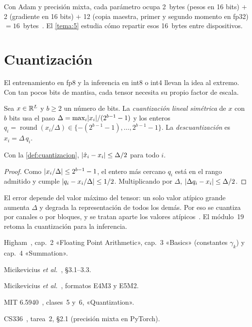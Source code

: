 \begin{observacion}
Con Adam y precisión mixta, cada parámetro ocupa 2~bytes (pesos en 16 bits) $+$ 2 (gradiente en 16 bits) $+$ 12 (copia maestra, primer y segundo momento en fp32) $=16$~bytes~\cite[§3.1]{zero}. El \cref{tema:5} estudia cómo repartir esos 16~bytes entre dispositivos.
\end{observacion}

\section{Cuantización}

El entrenamiento en fp8 y la inferencia en int8 o int4 llevan la idea al extremo. Con tan pocos bits de mantisa, cada tensor necesita su propio factor de escala.

\begin{definicion}\label{def:cuantizacion}
Sea $x\in\mathbb{R}^{L}$ y $b\ge 2$ un número de bits. La \emph{cuantización lineal simétrica} de $x$ con $b$ bits usa el paso $\Delta=\max_i\lvert x_i\rvert/(2^{b-1}-1)$ y los enteros $q_i=\operatorname{round}(x_i/\Delta)\in\{-(2^{b-1}-1),\dots,2^{b-1}-1\}$. La \emph{descuantización} es $\hat x_i=\Delta\,q_i$.
\end{definicion}

\begin{proposicion}\label{prop:cuantizacion}
Con la \cref{def:cuantizacion}, $\lvert\hat x_i-x_i\rvert\le\Delta/2$ para todo $i$.
\end{proposicion}

\begin{proof}
Como $\lvert x_i/\Delta\rvert\le 2^{b-1}-1$, el entero más cercano $q_i$ está en el rango admitido y cumple $\lvert q_i-x_i/\Delta\rvert\le 1/2$. Multiplicando por $\Delta$, $\lvert\Delta q_i-x_i\rvert\le\Delta/2$.
\end{proof}

El error depende del valor máximo del tensor: un solo valor atípico grande aumenta $\Delta$ y degrada la representación de todos los demás. Por eso se cuantiza por canales o por bloques, y se tratan aparte los valores atípicos~\cite{mit65940}. El módulo~19 retoma la cuantización para la inferencia.

\begin{lecturas}
\item Higham~\cite{higham}, cap.~2 «Floating Point Arithmetic», cap.~3 «Basics» (constantes $\gamma_k$) y cap.~4 «Summation».
\item Micikevicius \emph{et al.}~\cite{micikevicius}, §3.1--3.3.
\item Micikevicius \emph{et al.}~\cite{fp8}, formatos E4M3 y E5M2.
\item MIT 6.5940~\cite{mit65940}, clases~5 y~6, «Quantization».
\item CS336~\cite{cs336a2}, tarea~2, §2.1 (precisión mixta en PyTorch).
\end{lecturas}

